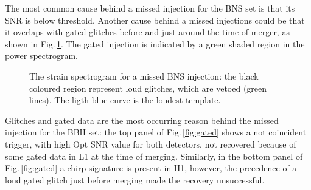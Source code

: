 \documentclass[binding=0.6cm, LaM]{sapthesis}
\begin{document}
	The most common cause behind a missed injection for the BNS set is that its SNR is below threshold.
    	Another cause behind a missed injections could be that it overlaps with gated glitches before and just around the time of merger, as shown in Fig.\,\ref{fig:gated_glitch}. 
	The gated injection is indicated by a green shaded region in the power spectrogram.
        \begin{figure}[t]
          \noindent
          \label{gated_glitch}
          \centering
          \caption{The strain spectrogram for a missed BNS injection: the black coloured region represent loud glitches, which are vetoed (green lines). The ligth blue curve is the loudest template. }
          \label{fig:gated_glitch}
        \end{figure}
        Glitches and gated data are the most occurring reason behind the missed injection for the BBH set: 
	the top panel of Fig.\,\ref{fig:gated} shows a not coincident trigger,  
	with high Opt SNR value for both detectors, not recovered  because of some gated data in L1 at the time of merging.
        Similarly, in the bottom panel of Fig.\,\ref{fig:gated} a chirp signature is present in H1, however, the precedence of a loud gated glitch just before merging
        made the recovery  unsuccessful.
\end{document}
